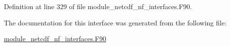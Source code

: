 Definition at line 329 of file module\+\_\+netcdf\+\_\+nf\+\_\+interfaces.\+F90.



The documentation for this interface was generated from the following file\+:\begin{DoxyCompactItemize}
\item 
\hyperlink{module__netcdf__nf__interfaces_8F90}{module\+\_\+netcdf\+\_\+nf\+\_\+interfaces.\+F90}\end{DoxyCompactItemize}
